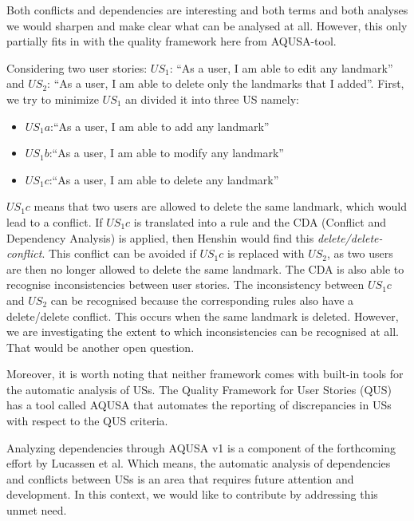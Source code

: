 Both conflicts and dependencies are interesting and both terms and both analyses we would sharpen  and make clear what can be analysed at all. However, this only partially fits in with the quality framework here from AQUSA-tool.

\begin{example}
Considering two user stories:  $US_1$: \enquote{As a user, I am able to edit any landmark} and $US_2$: \enquote{As a user, I am able to delete only the landmarks that I added}. First, we try to minimize $US_1$ an divided it into three US namely:
\begin{itemize}
\item $US_1a$:\enquote{As a user, I am able to add any landmark}
\item $US_1b$:\enquote{As a user, I am able to modify any landmark}
\item $US_1c$:\enquote{As a user, I am able to delete any landmark}
\end{itemize}
$US_1c$ means that two users are allowed to delete the same landmark, which would lead to a conflict. If $US_1c$ is translated into a rule and the CDA (Conflict and Dependency Analysis) is applied, then Henshin would find this \emph{delete/delete-conflict}. This conflict can be avoided if $US_1c$ is replaced with $US_2$, as two users are then no longer allowed to delete the same landmark.
The CDA is also able to recognise inconsistencies between user stories. The inconsistency between $US_1c$ and $US_2$ can be recognised because the corresponding rules also have a delete/delete conflict. This occurs when the same landmark is deleted. However, we are investigating the extent to which inconsistencies can be recognised at all. That would be another open question.
\end{example}

Moreover, it is worth noting that neither framework comes with built-in tools for the automatic analysis of USs. %
The Quality Framework for User Stories (QUS) has a tool called AQUSA that automates the reporting of discrepancies in USs with respect to the QUS criteria. 

Analyzing dependencies through AQUSA v1 is a component of the forthcoming effort by Lucassen et al. Which means, the automatic analysis of dependencies and conflicts between USs is an area that requires future attention and development. In this context, we would like to contribute by addressing this unmet need.
